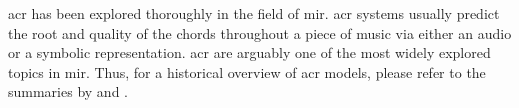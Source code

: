 

\gls{acr} has been explored thoroughly in the field of
\gls{mir}. \gls{acr} systems usually predict the root and
quality of the chords throughout a piece of music via either
an audio or a symbolic representation. \gls{acr} are
arguably one of the most widely explored topics in
\gls{mir}. Thus, for a historical overview of \gls{acr}
models, please refer to the summaries by
\textcite{pauwels201920} and \textcite{ju2021addressing}.
